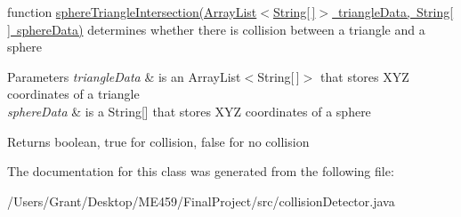 function \mbox{\hyperlink{classcollision_detector_a4fdda8a1bdcf60fc175ac39cd0b1a889}{sphere\+Triangle\+Intersection(\+Array\+List$<$\+String\mbox{[}$\,$\mbox{]}$>$ triangle\+Data, String\mbox{[}$\,$\mbox{]} sphere\+Data)}} determines whether there is collision between a triangle and a sphere 
\begin{DoxyParams}{Parameters}
{\em triangle\+Data} & is an Array\+List$<$\+String\mbox{[}$\,$\mbox{]}$>$ that stores X\+YZ coordinates of a triangle \\
\hline
{\em sphere\+Data} & is a String\mbox{[}\mbox{]} that stores X\+YZ coordinates of a sphere \\
\hline
\end{DoxyParams}
\begin{DoxyReturn}{Returns}
boolean, true for collision, false for no collision 
\end{DoxyReturn}


The documentation for this class was generated from the following file\+:\begin{DoxyCompactItemize}
\item 
/\+Users/\+Grant/\+Desktop/\+M\+E459/\+Final\+Project/src/collision\+Detector.\+java\end{DoxyCompactItemize}
